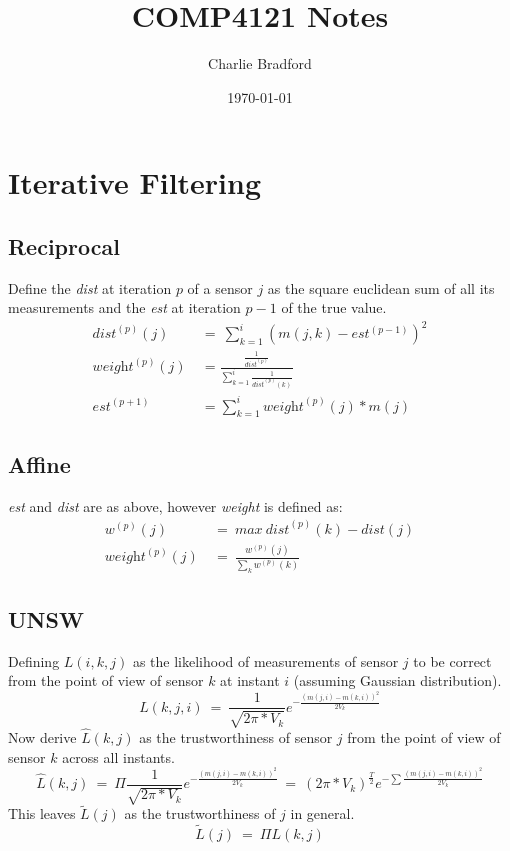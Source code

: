 \documentclass[a4paper]{article}
\title{COMP4121 Notes}
\author{Charlie Bradford}
\date{\today}
\begin{document}
\maketitle



\section{Iterative Filtering}


\subsection{Reciprocal}
Define the \textit{dist} at iteration $p$ of a sensor $j$ as the square euclidean sum of all its measurements and the \textit{est} at iteration $p-1$ of the true value.
\begin{align*}
	\textit{dist}^{(p)}(j)\ &=\ \sum\limits_{k=1}^{i}(m(j,k)-\textit{est}^{(p-1)})^2 \\
	\textit{weight}^{(p)}(j)\ &= \frac{\frac{1}{\textit{dist}^{(p)}}}{\sum\limits_{k=1}^{i}\frac{1}{\textit{dist}^{(p)}(k)}} \\
	\textit{est}^{(p+1)}\ &= \sum\limits_{k=1}^{i}\textit{weight}^{(p)}(j)*m(j)
\end{align*}


\subsection{Affine}

\textit{est} and \textit{dist} are as above, however \textit{weight} is defined as:
\begin{align*}
	w^{(p)}(j)\ &=\ \textit{max}\ \textit{dist}^{(p)}(k) - \textit{dist}(j) \\
	\textit{weight}^{(p)}(j)\ &=\ \frac{w^{(p)}(j)}{\sum\limits_k w^{(p)}(k)}
\end{align*}


\subsection{UNSW}
Defining $L(i,k,j)$ as the likelihood of measurements of sensor $j$ to be correct from the point of view of sensor $k$ at instant $i$ (assuming Gaussian distribution).
$$L(k,j,i)\ =\ \frac{1}{\sqrt{2\pi*V_k}}e^{-\frac{(m(j,i)-m(k,i))^2}{2V_k}}$$
Now derive $\hat{L}(k,j)$ as the trustworthiness of sensor $j$ from the point of view of sensor $k$ across all instants.
$$\hat{L}(k,j)\ =\ \Pi\frac{1}{\sqrt{2\pi*V_k}}e^{-\frac{(m(j,i)-m(k,i))^2}{2V_k}}\ =\ (2\pi*V_k)^{\frac{T}{2}}e^{-\sum\frac{(m(j,i)-m(k,i))^2}{2V_k}}$$
This leaves $\tilde{L}(j)$ as the trustworthiness of $j$ in general.
$$\tilde{L}(j)\ =\ \Pi L(k,j)$$
\end{document}
